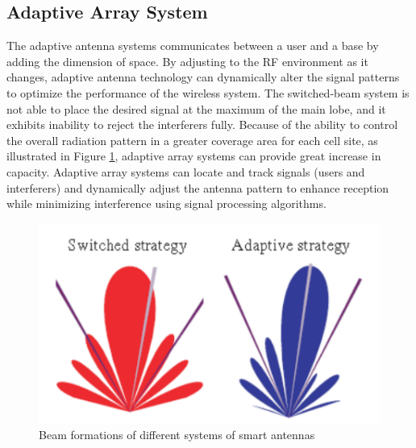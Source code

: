 \documentclass{home_assignment}
\begin{document}
{    \subsection*{Adaptive Array System}
    The adaptive antenna systems communicates between a user and a base by adding the dimension of space. By adjusting to the RF
    environment as it changes, adaptive antenna technology can dynamically alter the signal patterns to optimize the performance of the wireless system. The switched-beam system is not able to place the desired signal at the maximum of the main
    lobe, and it exhibits inability to reject the interferers fully. Because of the ability to control
    the overall radiation pattern in a greater coverage area for each cell site, as illustrated in
    Figure \ref{fig:comparision}, adaptive array systems can provide great increase in capacity. Adaptive array
    systems can locate and track signals (users and interferers) and dynamically adjust the
    antenna pattern to enhance reception while minimizing interference using signal processing
    algorithms.
    \begin{figure}[H]
        \centering
        \includegraphics[]{Figures/smart_antennas.png}
        \caption{Beam formations of different systems of smart antennas}
        \label{fig:comparision}
    \end{figure}
    }
\end{document}
